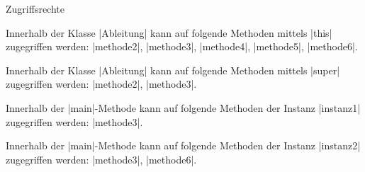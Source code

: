\begin{exercise}{Zugriffsrechte}
\begin{solution}
\begin{parts}
\item
Innerhalb der Klasse \code|Ableitung| kann auf folgende Methoden mittels \code|this| zugegriffen werden: \code|methode2|, \code|methode3|, \code|methode4|, \code|methode5|, \code|methode6|.

\item
Innerhalb der Klasse \code|Ableitung| kann auf folgende Methoden mittels \code|super| zugegriffen werden: \code|methode2|, \code|methode3|.

\item
Innerhalb der \code|main|-Methode kann auf folgende Methoden der Instanz \code|instanz1| zugegriffen werden: \code|methode3|.

\item
Innerhalb der \code|main|-Methode kann auf folgende Methoden der Instanz \code|instanz2| zugegriffen werden: \code|methode3|, \code|methode6|.
\end{parts}
\end{solution}
\end{exercise}
